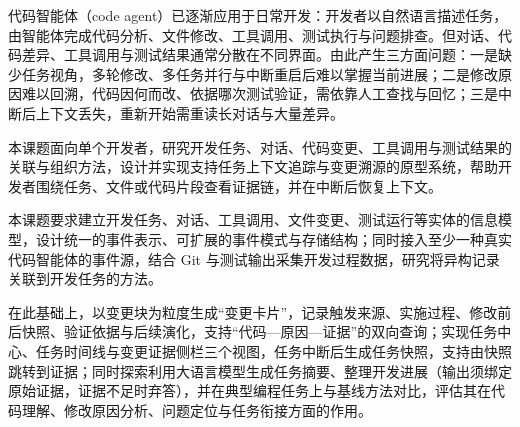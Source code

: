 


代码智能体（code agent）已逐渐应用于日常开发：开发者以自然语言描述任务，由智能体完成代码分析、文件修改、工具调用、测试执行与问题排查。但对话、代码差异、工具调用与测试结果通常分散在不同界面。由此产生三方面问题：一是缺少任务视角，多轮修改、多任务并行与中断重启后难以掌握当前进展；二是修改原因难以回溯，代码因何而改、依据哪次测试验证，需依靠人工查找与回忆；三是中断后上下文丢失，重新开始需重读长对话与大量差异。

本课题面向单个开发者，研究开发任务、对话、代码变更、工具调用与测试结果的关联与组织方法，设计并实现支持任务上下文追踪与变更溯源的原型系统，帮助开发者围绕任务、文件或代码片段查看证据链，并在中断后恢复上下文。


本课题要求建立开发任务、对话、工具调用、文件变更、测试运行等实体的信息模型，设计统一的事件表示、可扩展的事件模式与存储结构；同时接入至少一种真实代码智能体的事件源，结合 Git 与测试输出采集开发过程数据，研究将异构记录关联到开发任务的方法。

在此基础上，以变更块为粒度生成“变更卡片”，记录触发来源、实施过程、修改前后快照、验证依据与后续演化，支持“代码—原因—证据”的双向查询；实现任务中心、任务时间线与变更证据侧栏三个视图，任务中断后生成任务快照，支持由快照跳转到证据；同时探索利用大语言模型生成任务摘要、整理开发进展（输出须绑定原始证据，证据不足时弃答），并在典型编程任务上与基线方法对比，评估其在代码理解、修改原因分析、问题定位与任务衔接方面的作用。

